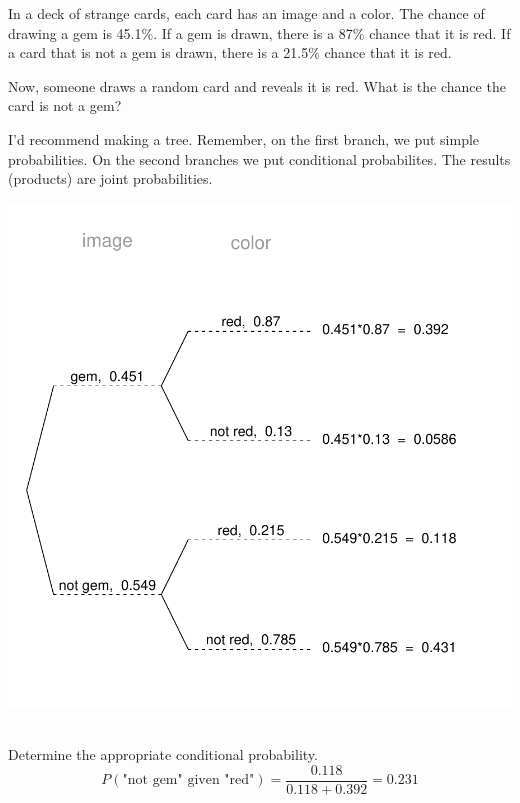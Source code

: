 
\begin{question}
In a deck of strange cards, each card has an image and a color. The
chance of drawing a gem is 45.1\%. If a gem is drawn, there is a 87\%
chance that it is red. If a card that is not a gem is drawn, there is a
21.5\% chance that it is red.

Now, someone draws a random card and reveals it is red. What is the
chance the card is not a gem?
\end{question}

\begin{solution}
I'd recommend making a tree. Remember, on the first branch, we put
simple probabilities. On the second branches we put conditional
probabilites. The results (products) are joint probabilities.

\includegraphics{tree-1.pdf} ~

Determine the appropriate conditional probability.
\[P(\text{"not gem" given "red"}) = \frac{0.118}{0.118+0.392} = 0.231 \]
\end{solution}

